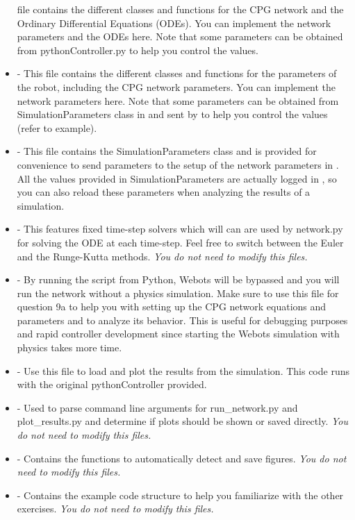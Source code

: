 \documentclass{cmc}
\begin{document}
\begin{itemize}
  file contains the different classes and functions for the CPG network and the
  Ordinary Differential Equations (ODEs). You can implement the network
  parameters and the ODEs here. Note that some parameters can be obtained from
  pythonController.py to help you control the values.
\item
   -
  This file contains the different classes and functions for the parameters of
  the robot, including the CPG network parameters. You can implement the network
  parameters here. Note that some parameters can be obtained from
  SimulationParameters class in  and sent by
   to help you control the values (refer to example).
\item
  - This file contains the SimulationParameters class and is provided for
  convenience to send parameters to the setup of the network parameters in
  . All the values provided in SimulationParameters
  are actually logged in , so you can also reload these
  parameters when analyzing the results of a simulation.
\item {} - This
  features fixed time-step solvers which will can are used by network.py for
  solving the ODE at each time-step. Feel free to switch between the Euler and
  the Runge-Kutta methods. \textit{You do not need to modify this files.}
\item {} -
  By running the script from Python, Webots will be bypassed and you will run
  the network without a physics simulation. Make sure to use this file for
  question 9a to help you with setting up the CPG network equations and
  parameters and to analyze its behavior. This is useful for debugging purposes
  and rapid controller development since starting the Webots simulation with
  physics takes more time.
\item {} -
  Use this file to load and plot the results from the simulation. This code runs
  with the original pythonController provided.
\item {} -
  Used to parse command line arguments for run\_network.py and plot\_results.py
  and determine if plots should be shown or saved directly. \textit{You do not
    need to modify this files.}
\item {} -
  Contains the functions to automatically detect and save figures. \textit{You
    do not need to modify this files.}
\item
   -
  Contains the example code structure to help you familiarize with the other
  exercises. \textit{You do not need to modify this files.}
\end{itemize}
\end{document}

